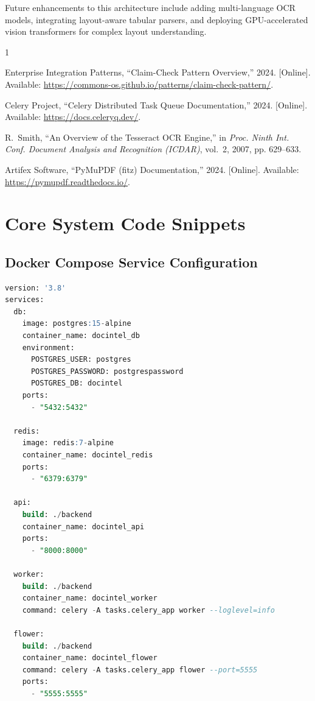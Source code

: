 \documentclass[peerreviewca]{IEEEtran}
\begin{document}
Future enhancements to this architecture include adding multi-language OCR models, integrating layout-aware tabular parsers, and deploying GPU-accelerated vision transformers for complex layout understanding.

\begin{thebibliography}{1}

Enterprise Integration Patterns, ``Claim-Check Pattern Overview,'' 2024. [Online]. Available: \url{https://commons-os.github.io/patterns/claim-check-pattern/}.

Celery Project, ``Celery Distributed Task Queue Documentation,'' 2024. [Online]. Available: \url{https://docs.celeryq.dev/}.

R.~Smith, ``An Overview of the Tesseract OCR Engine,'' in \emph{Proc. Ninth Int. Conf. Document Analysis and Recognition (ICDAR)}, vol.~2, 2007, pp. 629--633.

Artifex Software, ``PyMuPDF (fitz) Documentation,'' 2024. [Online]. Available: \url{https://pymupdf.readthedocs.io/}.

\end{thebibliography}

\appendices

\section{Core System Code Snippets}

\subsection{Docker Compose Service Configuration}
\begin{lstlisting}[language=SQL, caption={docker-compose.yml configuration snapshot}]
version: '3.8'
services:
  db:
    image: postgres:15-alpine
    container_name: docintel_db
    environment:
      POSTGRES_USER: postgres
      POSTGRES_PASSWORD: postgrespassword
      POSTGRES_DB: docintel
    ports:
      - "5432:5432"

  redis:
    image: redis:7-alpine
    container_name: docintel_redis
    ports:
      - "6379:6379"

  api:
    build: ./backend
    container_name: docintel_api
    ports:
      - "8000:8000"

  worker:
    build: ./backend
    container_name: docintel_worker
    command: celery -A tasks.celery_app worker --loglevel=info

  flower:
    build: ./backend
    container_name: docintel_flower
    command: celery -A tasks.celery_app flower --port=5555
    ports:
      - "5555:5555"
\end{lstlisting}
\end{document}
